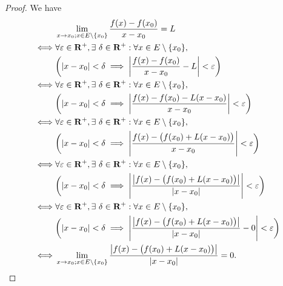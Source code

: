 \begin{proof}
    We have
    \begin{align*}
             & \lim_{x \to x_0 ; x \in E \setminus \{x_0\}} \frac{f(x) - f(x_0)}{x - x_0} = L                                                           \\
        \iff & \forall \varepsilon \in \mathbf{R}^+, \exists\ \delta \in \mathbf{R}^+ : \forall x \in E \setminus \{x_0\},                              \\
             & \bigg(\abs*{x - x_0} < \delta \implies \abs*{\frac{f(x) - f(x_0)}{x - x_0} - L} < \varepsilon\bigg)                                      \\
        \iff & \forall \varepsilon \in \mathbf{R}^+, \exists\ \delta \in \mathbf{R}^+ : \forall x \in E \setminus \{x_0\},                              \\
             & \bigg(\abs*{x - x_0} < \delta \implies \abs*{\frac{f(x) - f(x_0) - L(x - x_0)}{x - x_0}} < \varepsilon\bigg)                             \\
        \iff & \forall \varepsilon \in \mathbf{R}^+, \exists\ \delta \in \mathbf{R}^+ : \forall x \in E \setminus \{x_0\},                              \\
             & \bigg(\abs*{x - x_0} < \delta \implies \abs*{\frac{f(x) - \big(f(x_0) + L(x - x_0)\big)}{x - x_0}} < \varepsilon\bigg)                   \\
        \iff & \forall \varepsilon \in \mathbf{R}^+, \exists\ \delta \in \mathbf{R}^+ : \forall x \in E \setminus \{x_0\},                              \\
             & \bigg(\abs*{x - x_0} < \delta \implies \abs*{\frac{\abs*{f(x) - \big(f(x_0) + L(x - x_0)\big)}}{\abs*{x - x_0}}} < \varepsilon\bigg)     \\
        \iff & \forall \varepsilon \in \mathbf{R}^+, \exists\ \delta \in \mathbf{R}^+ : \forall x \in E \setminus \{x_0\},                              \\
             & \bigg(\abs*{x - x_0} < \delta \implies \abs*{\frac{\abs*{f(x) - \big(f(x_0) + L(x - x_0)\big)}}{\abs*{x - x_0}} - 0} < \varepsilon\bigg) \\
        \iff & \lim_{x \to x_0 ; x \in E \setminus \{x_0\}} \frac{\abs*{f(x) - \big(f(x_0) + L(x - x_0)\big)}}{\abs*{x - x_0}} = 0.
    \end{align*}
\end{proof}

